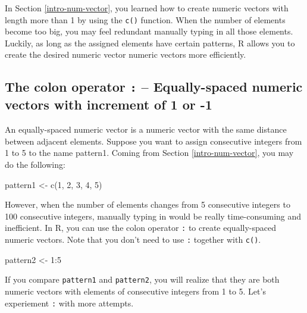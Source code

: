 \documentclass[
]{book}
\newenvironment{Shaded}{\begin{snugshade}}{\end{snugshade}}
\newcommand{\DecValTok}[1]{\textcolor[rgb]{0.00,0.00,0.81}{#1}}
\newcommand{\FunctionTok}[1]{\textcolor[rgb]{0.00,0.00,0.00}{#1}}
\newcommand{\NormalTok}[1]{#1}
\newcommand{\OtherTok}[1]{\textcolor[rgb]{0.56,0.35,0.01}{#1}}
\newcommand{\SpecialCharTok}[1]{\textcolor[rgb]{0.00,0.00,0.00}{#1}}
\begin{document}
In Section \ref{intro-num-vector}, you learned how to create numeric vectors with length more than 1 by using the \texttt{c()} function. When the number of elements become too big, you may feel redundant manually typing in all those elements. Luckily, as long as the assigned elements have certain patterns, R allows you to create the desired numeric vector numeric vectors more efficiently.

\hypertarget{the-colon-operator-equally-spaced-numeric-vectors-with-increment-of-1-or--1}{%
\subsection{\texorpdfstring{The colon operator \texttt{:} -- Equally-spaced numeric vectors with increment of 1 or -1}{The colon operator : -- Equally-spaced numeric vectors with increment of 1 or -1}}\label{the-colon-operator-equally-spaced-numeric-vectors-with-increment-of-1-or--1}}

An equally-spaced numeric vector is a numeric vector with the same distance between adjacent elements. Suppose you want to assign consecutive integers from 1 to 5 to the name pattern1. Coming from Section \ref{intro-num-vector}, you may do the following:

\begin{Shaded}
\begin{Highlighting}[]
\NormalTok{pattern1 }\OtherTok{\textless{}{-}} \FunctionTok{c}\NormalTok{(}\DecValTok{1}\NormalTok{, }\DecValTok{2}\NormalTok{, }\DecValTok{3}\NormalTok{, }\DecValTok{4}\NormalTok{, }\DecValTok{5}\NormalTok{)}
\end{Highlighting}
\end{Shaded}

However, when the number of elements changes from 5 consecutive integers to 100 consecutive integers, manually typing in would be really time-consuming and inefficient. In R, you can use the colon operator \texttt{:} to create equally-spaced numeric vectors. Note that you don't need to use \texttt{:} together with \texttt{c()}.

\begin{Shaded}
\begin{Highlighting}[]
\NormalTok{pattern2 }\OtherTok{\textless{}{-}} \DecValTok{1}\SpecialCharTok{:}\DecValTok{5}
\end{Highlighting}
\end{Shaded}

If you compare \texttt{pattern1} and \texttt{pattern2}, you will realize that they are both numeric vectors with elements of consecutive integers from 1 to 5. Let's experiement \texttt{:} with more attempts.
\end{document}
